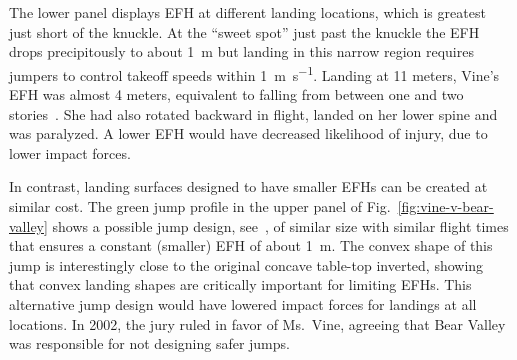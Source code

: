 \documentclass[smallextended]{svjour3}       %
\begin{document}
The lower panel displays EFH at different landing locations, which is greatest
just short of the knuckle.  At the ``sweet spot'' just past the knuckle the EFH
drops precipitously to  about 1~\si{\meter} but landing in this narrow region
requires jumpers to control takeoff speeds within 1~\si{\meter\per\second}.
Landing at 11 meters, Vine's EFH was almost 4 meters, equivalent to falling
from between one and two stories~\cite{Vish2005}. She had also rotated backward
in flight, landed on her lower spine and was paralyzed. A lower EFH would have
decreased likelihood of injury, due to lower impact forces.

In contrast, landing surfaces designed to have smaller EFHs can be created at
similar cost. The green jump profile in the upper panel of
Fig.~\ref{fig:vine-v-bear-valley} shows a possible jump design,
see~\cite{Levy2015}, of similar size with similar flight times that ensures a
constant (smaller) EFH of about 1~\si{\meter}. The convex shape of this jump is
interestingly close to the original concave table-top  inverted, showing that
convex landing shapes are critically important for limiting EFHs. This
alternative jump design would have lowered impact forces for landings at all
locations. In 2002, the jury ruled in favor of Ms.~Vine, agreeing that Bear
Valley was responsible for not designing safer jumps.
\end{document}
